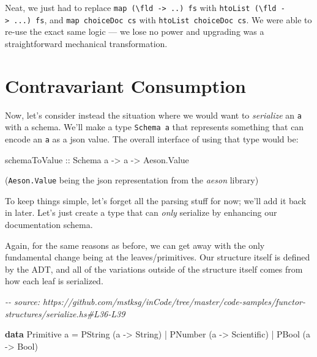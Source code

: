 \documentclass[]{article}
\newenvironment{Shaded}{}{}
\newcommand{\CommentTok}[1]{\textcolor[rgb]{0.38,0.63,0.69}{\textit{#1}}}
\newcommand{\DataTypeTok}[1]{\textcolor[rgb]{0.56,0.13,0.00}{#1}}
\newcommand{\KeywordTok}[1]{\textcolor[rgb]{0.00,0.44,0.13}{\textbf{#1}}}
\newcommand{\NormalTok}[1]{#1}
\newcommand{\OperatorTok}[1]{\textcolor[rgb]{0.40,0.40,0.40}{#1}}
\newcommand{\OtherTok}[1]{\textcolor[rgb]{0.00,0.44,0.13}{#1}}
\begin{document}
Neat, we just had to replace
\texttt{map\ (\textbackslash{}fld\ -\textgreater{}\ ..)\ fs} with
\texttt{htoList\ (\textbackslash{}fld\ -\textgreater{}\ ...)\ fs}, and
\texttt{map\ choiceDoc\ cs} with \texttt{htoList\ choiceDoc\ cs}. We were able
to re-use the exact same logic --- we lose no power and upgrading was a
straightforward mechanical transformation.

\section{Contravariant Consumption}\label{contravariant-consumption}

Now, let's consider instead the situation where we would want to
\emph{serialize} an \texttt{a} with a schema. We'll make a type
\texttt{Schema\ a} that represents something that can encode an \texttt{a} as a
json value. The overall interface of using that type would be:

\begin{Shaded}
\begin{Highlighting}[]
\OtherTok{schemaToValue ::} \DataTypeTok{Schema}\NormalTok{ a }\OtherTok{{-}\textgreater{}}\NormalTok{ a }\OtherTok{{-}\textgreater{}} \DataTypeTok{Aeson.Value}
\end{Highlighting}
\end{Shaded}

(\texttt{Aeson.Value} being the json representation from the \emph{aeson}
library)

To keep things simple, let's forget all the parsing stuff for now; we'll add it
back in later. Let's just create a type that can \emph{only} serialize by
enhancing our documentation schema.

Again, for the same reasons as before, we can get away with the only fundamental
change being at the leaves/primitives. Our structure itself is defined by the
ADT, and all of the variations outside of the structure itself comes from how
each leaf is serialized.

\begin{Shaded}
\begin{Highlighting}[]
\CommentTok{{-}{-} source: https://github.com/mstksg/inCode/tree/master/code{-}samples/functor{-}structures/serialize.hs\#L36{-}L39}

\KeywordTok{data} \DataTypeTok{Primitive}\NormalTok{ a }\OtherTok{=}
      \DataTypeTok{PString}\NormalTok{ (a }\OtherTok{{-}\textgreater{}} \DataTypeTok{String}\NormalTok{)}
    \OperatorTok{|} \DataTypeTok{PNumber}\NormalTok{ (a }\OtherTok{{-}\textgreater{}} \DataTypeTok{Scientific}\NormalTok{)}
    \OperatorTok{|} \DataTypeTok{PBool}\NormalTok{   (a }\OtherTok{{-}\textgreater{}} \DataTypeTok{Bool}\NormalTok{)}
\end{Highlighting}
\end{Shaded}
\end{document}
